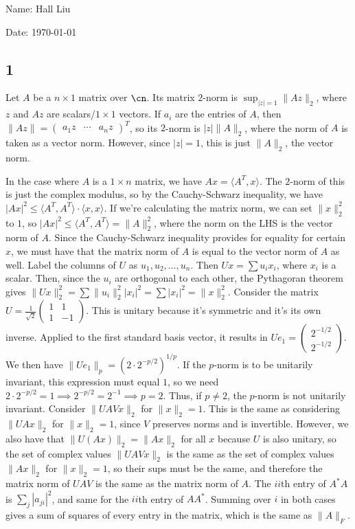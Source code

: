 \documentclass{article}
\newcommand{\openm}{\begin{pmatrix}}
\newcommand{\closem}{\end{pmatrix}}
\begin{document}
Name: Hall Liu

Date: \today 
\vspace{1.5cm}

\subsection*{1}
Let $A$ be a $n\times 1$ matrix over $\cn$. Its matrix $2$-norm is $\sup_{|z|=1}\|Az\|_2$, where $z$ and $Az$ are scalars/$1\times 1$ vectors. If $a_i$ are the entries of $A$, then $\|Az\|=\openm a_1z&\cdots&a_nz\closem^T$, so its $2$-norm is $|z|\|A\|_2$, where the norm of $A$ is taken as a vector norm. However, since $|z|=1$, this is just $\|A\|_2$, the vector norm.

In the case where $A$ is a $1\times n$ matrix, we have $Ax=\langle A^T,x\rangle$. The $2$-norm of this is just the complex modulus, so by the Cauchy-Schwarz inequality, we have $|Ax|^2\leq\langle A^T,A^T\rangle\cdot\langle x,x\rangle$. If we're calculating the matrix norm, we can set $\|x\|_2^2$ to $1$, so $|Ax|^2\leq\langle A^T,A^T\rangle=\|A\|_2^2$, where the norm on the LHS is the vector norm of $A$. Since the Cauchy-Schwarz inequality provides for equality for certain $x$, we must have that the matrix norm of $A$ is equal to the vector norm of $A$ as well.
Label the columns of $U$ as $u_1,u_2,\ldots,u_n$. Then $Ux=\sum u_ix_i$, where $x_i$ is a scalar. Then, since the $u_i$ are orthogonal to each other, the Pythagoran theorem gives $\|Ux\|_2^2=\sum \|u_i\|_2^2|x_i|^2=\sum|x_i|^2=\|x\|_2^2$.
Consider the matrix $U=\frac{1}{\sqrt{2}}\openm1&1\\1&-1\closem$. This is unitary because it's symmetric and it's its own inverse. Applied to the first standard basis vector, it results in $Ue_1=\openm2^{-1/2}\\2^{-1/2}\closem$. We then have $\|Ue_1\|_p=\left(2\cdot2^{-p/2}\right)^{1/p}$. If the $p$-norm is to be unitarily invariant, this expression must equal $1$, so we need $2\cdot2^{-p/2}=1\implies2^{-p/2}=2^{-1}\implies p=2$. Thus, if $p\neq2$, the $p$-norm is not unitarily invariant.
Consider $\|UAVx\|_2$ for $\|x\|_2=1$. This is the same as considering $\|UAx\|_2$ for $\|x\|_2=1$, since $V$ preserves norms and is invertible. However, we also have that $\|U(Ax)\|_2=\|Ax\|_2$ for all $x$ because $U$ is also unitary, so the set of complex values $\|UAVx\|_2$ is the same as the set of complex values $\|Ax\|_2$ for $\|x\|_2=1$, so their sups must be the same, and therefore the matrix norm of $UAV$ is the same as the matrix norm of $A$.
The $ii$th entry of $A^*A$ is $\sum_j|a_{ji}|^2$, and same for the $ii$th entry of $AA^*$. Summing over $i$ in both cases gives a sum of squares of every entry in the matrix, which is the same as $\|A\|_F$. 
\end{document}
